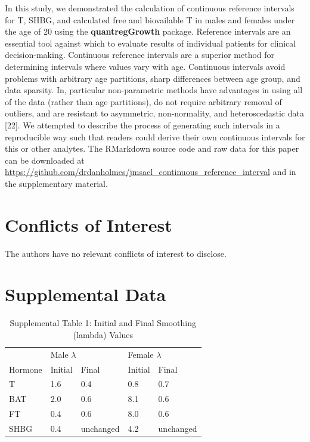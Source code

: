 \documentclass[]{elsarticle} %
\begin{document}
In this study, we demonstrated the calculation of continuous reference
intervals for T, SHBG, and calculated free and biovailable T in males
and females under the age of 20 using the \textbf{quantregGrowth}
package. Reference intervals are an essential tool against which to
evaluate results of individual patients for clinical decision-making.
Continuous reference intervals are a superior method for determining
intervals where values vary with age. Continuous intervals avoid
problems with arbitrary age partitions, sharp differences between age
group, and data sparsity. In, particular non-parametric methods have
advantages in using all of the data (rather than age partitions), do not
require arbitrary removal of outliers, and are resistant to asymmetric,
non-normality, and heteroscedastic data {[}22{]}. We attempted to
describe the process of generating such intervals in a reproducible way
such that readers could derive their own continuous intervals for this
or other analytes. The RMarkdown source code and raw data for this paper
can be downloaded at
\url{https://github.com/drdanholmes/jmsacl_continuous_reference_interval}
and in the supplementary material.

\hypertarget{conflicts-of-interest}{%
\section{Conflicts of Interest}\label{conflicts-of-interest}}

The authors have no relevant conflicts of interest to disclose.

\hypertarget{supplemental-data}{%
\section{Supplemental Data}\label{supplemental-data}}

\begin{table}[]
\caption*{Supplemental Table 1: Initial and Final Smoothing (lambda) Values}
\label{tab:my-table}
\begin{tabular}{l|llll}
                          & \multicolumn{2}{l}{Male $\lambda$} & \multicolumn{2}{l}{Female $\lambda$} \\ \cline{2-5} 
Hormone                   & Initial       & Final          & Initial        & Final            \\ \hline
T                         & 1.6           & 0.4            & 0.8            & 0.7              \\
BAT                       & 2.0           & 0.6            & 8.1            & 0.6              \\
FT                        & 0.4           & 0.6            & 8.0            & 0.6              \\
SHBG                      & 0.4           & unchanged      & 4.2            & unchanged       
\end{tabular}
\end{table}
\end{document}
